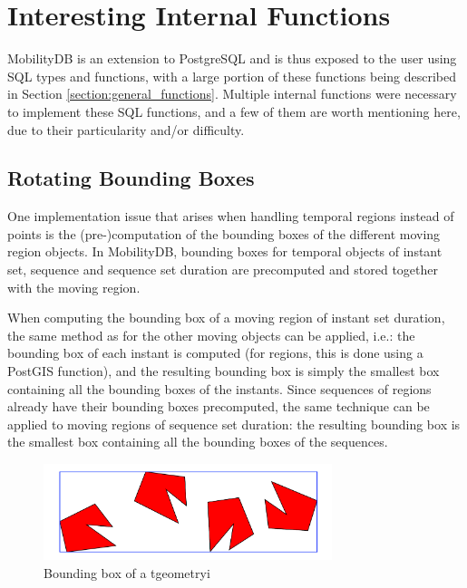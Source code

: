 
\section{Interesting Internal Functions}
\label{section:internal_functions}

MobilityDB is an extension to PostgreSQL and is thus exposed to the user using SQL types and functions, with a large portion of these functions being described in Section \ref{section:general_functions}. Multiple internal functions were necessary to implement these SQL functions, and a few of them are worth mentioning here, due to their particularity and/or difficulty.

\subsection{Rotating Bounding Boxes}
\label{section:bbox}

One implementation issue that arises when handling temporal regions instead of points is the (pre-)computation of the bounding boxes of the different moving region objects. In MobilityDB, bounding boxes for temporal objects of instant set, sequence and sequence set duration are precomputed and stored together with the moving region.
    
When computing the bounding box of a moving region of instant set duration, the same method as for the other moving objects can be applied, i.e.: the bounding box of each instant is computed (for regions, this is done using a PostGIS function), and the resulting bounding box is simply the smallest box containing all the bounding boxes of the instants. Since sequences of regions already have their bounding boxes precomputed, the same technique can be applied to moving regions of sequence set duration: the resulting bounding box is the smallest box containing all the bounding boxes of the sequences.

\begin{figure}[h!]
    \centering
    \includegraphics[width=0.75\textwidth]{images/tgeometryi_bbox.pdf}
    \caption{Bounding box of a tgeometryi}
    \label{fig:tgeometryi_bbox}
\end{figure}


